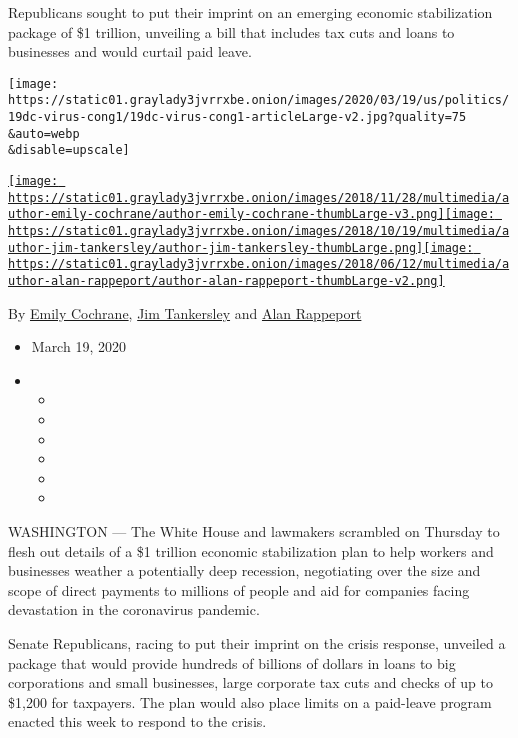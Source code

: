 Republicans sought to put their imprint on an emerging economic
stabilization package of \$1 trillion, unveiling a bill that includes
tax cuts and loans to businesses and would curtail paid leave.

\texttt{[image: https://static01.graylady3jvrrxbe.onion/images/2020/03/19/us/politics/19dc-virus-cong1/19dc-virus-cong1-articleLarge-v2.jpg?quality=75\\\&auto=webp\\\&disable=upscale]}

\href{https://www.nytimes3xbfgragh.onion/by/emily-cochrane}{\texttt{[image: https://static01.graylady3jvrrxbe.onion/images/2018/11/28/multimedia/author-emily-cochrane/author-emily-cochrane-thumbLarge-v3.png]}}\href{https://www.nytimes3xbfgragh.onion/by/jim-tankersley}{\texttt{[image: https://static01.graylady3jvrrxbe.onion/images/2018/10/19/multimedia/author-jim-tankersley/author-jim-tankersley-thumbLarge.png]}}\href{https://www.nytimes3xbfgragh.onion/by/alan-rappeport}{\texttt{[image: https://static01.graylady3jvrrxbe.onion/images/2018/06/12/multimedia/author-alan-rappeport/author-alan-rappeport-thumbLarge-v2.png]}}

By \href{https://www.nytimes3xbfgragh.onion/by/emily-cochrane}{Emily
Cochrane},
\href{https://www.nytimes3xbfgragh.onion/by/jim-tankersley}{Jim
Tankersley} and
\href{https://www.nytimes3xbfgragh.onion/by/alan-rappeport}{Alan
Rappeport}

\begin{itemize}
\item
  March 19, 2020
\item
  \begin{itemize}
  \item
  \item
  \item
  \item
  \item
  \item
  \end{itemize}
\end{itemize}

WASHINGTON --- The White House and lawmakers scrambled on Thursday to
flesh out details of a \$1 trillion economic stabilization plan to help
workers and businesses weather a potentially deep recession, negotiating
over the size and scope of direct payments to millions of people and aid
for companies facing devastation in the coronavirus pandemic.

Senate Republicans, racing to put their imprint on the crisis response,
unveiled a package that would provide hundreds of billions of dollars in
loans to big corporations and small businesses, large corporate tax cuts
and checks of up to \$1,200 for taxpayers. The plan would also place
limits on a paid-leave program enacted this week to respond to the
crisis.

